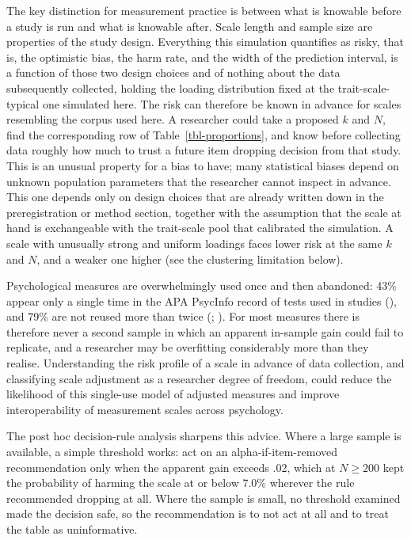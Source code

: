 \documentclass[
  nonatbib,
  authoryear,
  preprint]{elsarticle}
\begin{document}
The key distinction for measurement practice is between what is knowable
before a study is run and what is knowable after. Scale length and
sample size are properties of the study design. Everything this
simulation quantifies as risky, that is, the optimistic bias, the harm
rate, and the width of the prediction interval, is a function of those
two design choices and of nothing about the data subsequently collected,
holding the loading distribution fixed at the trait-scale-typical one
simulated here. The risk can therefore be known in advance for scales
resembling the corpus used here. A researcher could take a proposed
\(k\) and \(N\), find the corresponding row of
Table~\ref{tbl-proportions}, and know before collecting data roughly how
much to trust a future item dropping decision from that study. This is
an unusual property for a bias to have; many statistical biases depend
on unknown population parameters that the researcher cannot inspect in
advance. This one depends only on design choices that are already
written down in the preregistration or method section, together with the
assumption that the scale at hand is exchangeable with the trait-scale
pool that calibrated the simulation. A scale with unusually strong and
uniform loadings faces lower risk at the same \(k\) and \(N\), and a
weaker one higher (see the clustering limitation below).

Psychological measures are overwhelmingly used once and then abandoned:
43\% appear only a single time in the APA PsycInfo record of tests used
in studies (), and 79\% are not reused more than twice
(; ). For most measures there is
therefore never a second sample in which an apparent in-sample gain
could fail to replicate, and a researcher may be overfitting
considerably more than they realise. Understanding the risk profile of a
scale in advance of data collection, and classifying scale adjustment as
a researcher degree of freedom, could reduce the likelihood of this
single-use model of adjusted measures and improve interoperability of
measurement scales across psychology.

The post hoc decision-rule analysis sharpens this advice. Where a large
sample is available, a simple threshold works: act on an
alpha-if-item-removed recommendation only when the apparent gain exceeds
.02, which at \(N \geq 200\) kept the probability of harming the scale
at or below 7.0\% wherever the rule recommended dropping at all. Where
the sample is small, no threshold examined made the decision safe, so
the recommendation is to not act at all and to treat the table as
uninformative.
\end{document}
